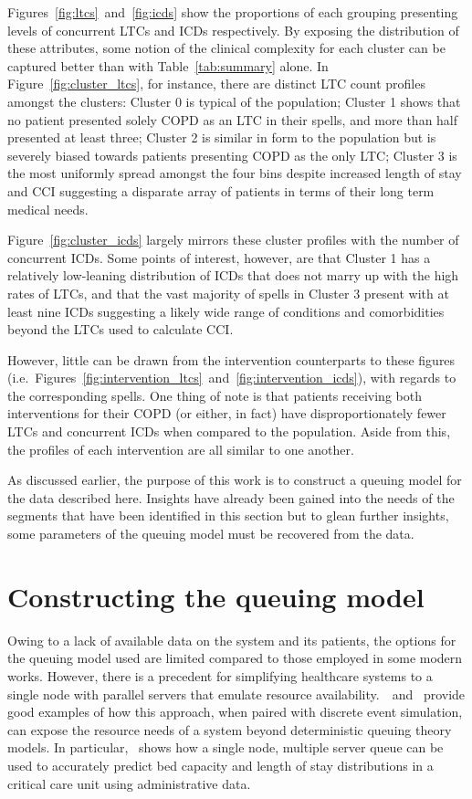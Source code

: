 \documentclass[11pt]{article}
\begin{document}
Figures~\ref{fig:ltcs}~and~\ref{fig:icds} show the proportions of each grouping
presenting levels of concurrent LTCs and ICDs respectively. By exposing the
distribution of these attributes, some notion of the clinical complexity for
each cluster can be captured better than with Table~\ref{tab:summary} alone. In
Figure~\ref{fig:cluster_ltcs}, for instance, there are distinct LTC count
profiles amongst the clusters: Cluster 0 is typical of the population; Cluster 1
shows that no patient presented solely COPD as an LTC in their spells, and more
than half presented at least three; Cluster 2 is similar in form to the
population but is severely biased towards patients presenting COPD as the only
LTC; Cluster 3 is the most uniformly spread amongst the four bins despite
increased length of stay and CCI suggesting a disparate array of patients in
terms of their long term medical needs.

Figure~\ref{fig:cluster_icds} largely mirrors these cluster profiles with the
number of concurrent ICDs. Some points of interest, however, are that Cluster 1
has a relatively low-leaning distribution of ICDs that does not marry up with
the high rates of LTCs, and that the vast majority of spells in Cluster 3
present with at least nine ICDs suggesting a likely wide range of conditions and
comorbidities beyond the LTCs used to calculate CCI.\

However, little can be drawn from the intervention counterparts to these figures
(i.e.\ Figures~\ref{fig:intervention_ltcs}~and~\ref{fig:intervention_icds}),
with regards to the corresponding spells. One thing of note is that patients
receiving both interventions for their COPD (or either, in fact) have
disproportionately fewer LTCs and concurrent ICDs when compared to the
population. Aside from this, the profiles of each intervention are all similar
to one another.

As discussed earlier, the purpose of this work is to construct a queuing model
for the data described here. Insights have already been gained into the needs of
the segments that have been identified in this section but to glean further
insights, some parameters of the queuing model must be recovered from the data.

\section{Constructing the queuing model}\label{sec:model}

Owing to a lack of available data on the system and its patients, the options
for the queuing model used are limited compared to those employed in some modern
works. However, there is a precedent for simplifying healthcare systems to a
single node with parallel servers that emulate resource
availability.~\cite{Steins2013}~and~\cite{Williams2015} provide good examples of
how this approach, when paired with discrete event simulation, can expose the
resource needs of a system beyond deterministic queuing theory models. In
particular,~\cite{Williams2015} shows how a single node, multiple server queue
can be used to accurately predict bed capacity and length of stay distributions
in a critical care unit using administrative data.
\end{document}
